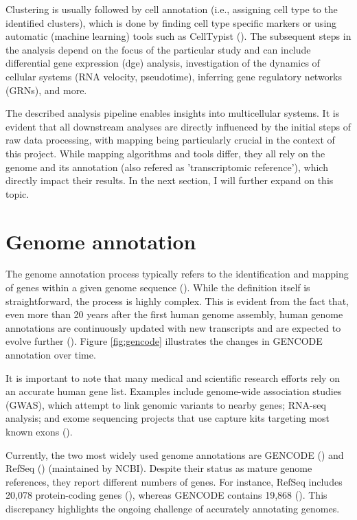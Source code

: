 \begin{itemize}
Clustering is usually followed by cell annotation (i.e., assigning cell type to the identified clusters),
which is done by finding cell type specific markers
or using automatic (machine learning) tools such as CellTypist (\cite{Dom2022}).
The subsequent steps in the analysis depend on the focus of the particular study and can include
differential gene expression (dge) analysis,
investigation of the dynamics of cellular systems (RNA velocity, pseudotime),
inferring gene regulatory networks (GRNs), and more.
\end{itemize}

The described analysis pipeline enables insights into multicellular systems.
It is evident that all downstream analyses are directly influenced by the initial steps of raw data processing,
with mapping being particularly crucial in the context of this project.
While mapping algorithms and tools differ, they all rely on the genome and its annotation (also refered as 'transcriptomic reference'),
which directly impact their results.
In the next section, I will further expand on this topic.

\section{Genome annotation}

The genome annotation process typically refers to the identification and mapping of genes within a given genome sequence (\cite{Guigo2023}).
While the definition itself is straightforward, the process is highly complex.
This is evident from the fact that, even more than 20 years after the first human genome assembly,
human genome annotations are continuously updated with new transcripts and are expected to evolve further (\cite{Mudge2024}).
Figure \ref{fig:gencode} illustrates the changes in GENCODE annotation over time.

It is important to note that many medical and scientific research efforts rely on an accurate human gene list.
Examples include genome-wide association studies (GWAS), which attempt to link genomic variants to nearby genes;
RNA-seq analysis; and exome sequencing projects that use capture kits targeting most known exons (\cite{Pertea2018}).

Currently, the two most widely used genome annotations are GENCODE (\cite{Mudge2024}) and RefSeq (\cite{OLeary2015}) (maintained by NCBI).
Despite their status as mature genome references, they report different numbers of genes.
For instance, RefSeq includes 20,078 protein-coding genes (\cite{ncbi}), whereas GENCODE contains 19,868 (\cite{ensembl}).
This discrepancy highlights the ongoing challenge of accurately annotating genomes.

